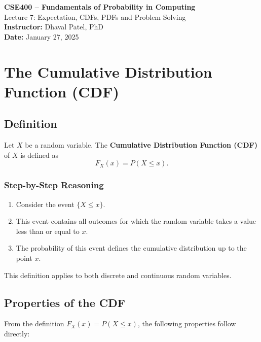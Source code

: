 \documentclass[12pt]{article}
\begin{document}
\begin{center}
    {\Large \textbf{CSE400 -- Fundamentals of Probability in Computing}}\\[0.2cm]
    {\large Lecture 7: Expectation, CDFs, PDFs and Problem Solving}\\[0.3cm]
    \textbf{Instructor:} Dhaval Patel, PhD\\
    \textbf{Date:} January 27, 2025
\end{center}


\section{The Cumulative Distribution Function (CDF)}

\subsection{Definition}

Let $X$ be a random variable. The \textbf{Cumulative Distribution Function (CDF)} of $X$ is defined as
\[
F_X(x) = P(X \le x).
\]

\subsubsection*{Step-by-Step Reasoning}

\begin{enumerate}
    \item Consider the event $\{X \le x\}$.
    \item This event contains all outcomes for which the random variable takes a value less than or equal to $x$.
    \item The probability of this event defines the cumulative distribution up to the point $x$.
\end{enumerate}

This definition applies to both discrete and continuous random variables.

\subsection{Properties of the CDF}

From the definition $F_X(x) = P(X \le x)$, the following properties follow directly:
\end{document}

